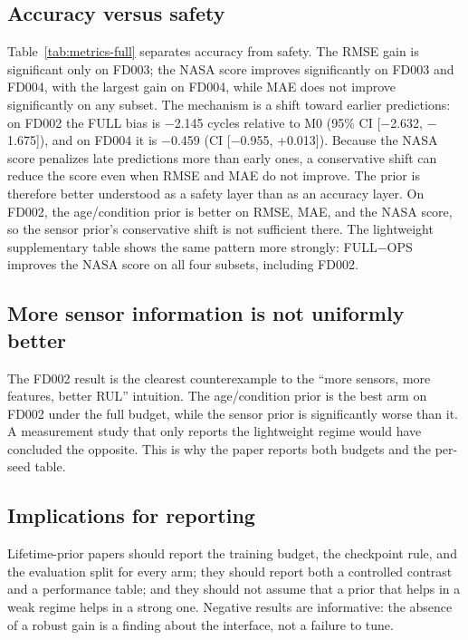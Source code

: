 \documentclass[journal]{IEEEtran}
\begin{document}
\subsection{Accuracy versus safety}
Table~\ref{tab:metrics-full} separates accuracy from safety. The RMSE gain is significant only on FD003; the NASA score improves significantly on FD003 and FD004, with the largest gain on FD004, while MAE does not improve significantly on any subset. The mechanism is a shift toward earlier predictions: on FD002 the FULL bias is $-$2.145 cycles relative to M0 (95\% CI [$-$2.632, $-$1.675]), and on FD004 it is $-$0.459 (CI [$-$0.955, +0.013]). Because the NASA score penalizes late predictions more than early ones, a conservative shift can reduce the score even when RMSE and MAE do not improve. The prior is therefore better understood as a safety layer than as an accuracy layer. On FD002, the age/condition prior is better on RMSE, MAE, and the NASA score, so the sensor prior's conservative shift is not sufficient there. The lightweight supplementary table shows the same pattern more strongly: FULL$-$OPS improves the NASA score on all four subsets, including FD002.

\subsection{More sensor information is not uniformly better}
The FD002 result is the clearest counterexample to the ``more sensors, more features, better RUL'' intuition. The age/condition prior is the best arm on FD002 under the full budget, while the sensor prior is significantly worse than it. A measurement study that only reports the lightweight regime would have concluded the opposite. This is why the paper reports both budgets and the per-seed table.

\subsection{Implications for reporting}
Lifetime-prior papers should report the training budget, the checkpoint rule, and the evaluation split for every arm; they should report both a controlled contrast and a performance table; and they should not assume that a prior that helps in a weak regime helps in a strong one. Negative results are informative: the absence of a robust gain is a finding about the interface, not a failure to tune.
\end{document}
